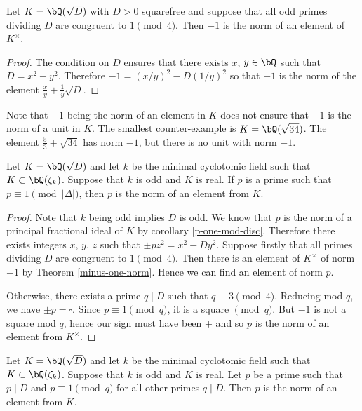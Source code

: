 \begin{thm}\label{minus-one-norm}
Let $K = \bQ(\sqrt{D})$ with $D >0$ squarefree and suppose that all odd primes dividing $D$ are congruent to $1 \pmod 4$. Then $-1$ is the norm of an element of $K^{\times}$. 
\end{thm}

\begin{proof}
The condition on $D$ ensures that there exists $x$, $y \in \bQ$ such that $D = x^2 + y^2$. Therefore $-1 = (x / y)^2 - D(1/ y)^2$ so that $-1$ is the norm of the element $\frac{x}{y} + \frac{1}{y} \sqrt{D}$.

\end{proof}

Note that $-1$ being the norm of an element in $K$ does not ensure that $-1$ is the norm of a unit in $K$. The smallest counter-example is $K = \bQ(\sqrt{34})$. The element $\frac{5}{3} + \sqrt{34}$ has norm $-1$, but there is no unit with norm $-1$. 

\begin{thm}\label{p-norm-elem-1}
    Let $K = \bQ(\sqrt{D})$ and let $k$ be the minimal cyclotomic field such that $K \subset \bQ(\zeta_k)$. Suppose that $k$ is odd and $K$ is real.  If $p$ is a prime such that $p \equiv 1 \pmod {|\Delta|}$, then $p$ is the norm of an element from $K$. 
\end{thm}

\begin{proof}
    Note that $k$ being odd implies $D$ is odd. We know that $p$ is the norm of a principal fractional ideal of $K$ by corollary \ref{p-one-mod-disc}. Therefore there exists integers $x$, $y$, $z$ such that $\pm p z^2 = x^2 - Dy^2$. Suppose firstly that all primes dividing $D$ are congruent to $1 \pmod 4$. Then there is an element of $K^{\times}$ of norm $-1$ by Theorem \ref{minus-one-norm}. Hence we can find an element of norm $p$.

    Otherwise, there exists a prime $q \mid D$ such that $q \equiv 3 \pmod 4$. Reducing mod $q$, we have
    $ \pm p = \square$. Since $p \equiv 1 \pmod q$, it is a square $\pmod q$. But $-1$ is not a square mod $q$, hence our sign must have been $+$ and so $p$ is the norm of an element from $K^{\times}$.
\end{proof}

\begin{thm}\label{p-norm-elem-2}
    Let $K = \bQ(\sqrt{D})$ and let $k$ be the minimal cyclotomic field such that $K \subset \bQ(\zeta_k)$. Suppose that $k$ is odd and $K$ is real. Let $p$ be a prime such that $p \mid D$ and $p \equiv 1 \pmod q$ for all other primes $q \mid D$. Then $p$ is the norm of an element from $K$. 
\end{thm}

